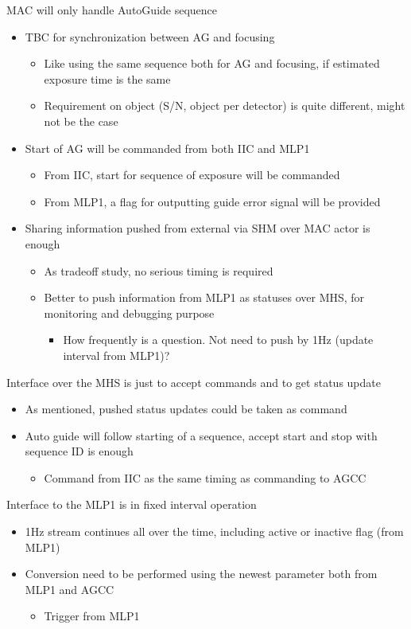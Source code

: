 \documentclass[a4paper,notitlepage]{article}
\begin{document}
MAC will only handle AutoGuide sequence
\begin{itemize}
  \item TBC for synchronization between AG and focusing
  \begin{itemize}
    \item Like using the same sequence both for AG and focusing, if estimated exposure time is the same
    \item Requirement on object (S/N, object per detector) is quite different, might not be the case
  \end{itemize}
  \item Start of AG will be commanded from both IIC and MLP1
  \begin{itemize}
    \item From IIC, start for sequence of exposure will be commanded
    \item From MLP1, a flag for outputting guide error signal will be provided
  \end{itemize}
  \item Sharing information pushed from external via SHM over MAC actor is enough
  \begin{itemize}
    \item As tradeoff study, no serious timing is required
    \item Better to push information from MLP1 as statuses over MHS, for monitoring and debugging purpose
    \begin{itemize}
      \item How frequently is a question. Not need to push by 1Hz (update interval from MLP1)?
    \end{itemize}
  \end{itemize}
\end{itemize}

Interface over the MHS is just to accept commands and to get status update
\begin{itemize}
  \item As mentioned, pushed status updates could be taken as command
  \item Auto guide will follow starting of a sequence, accept start and stop with sequence ID is enough
  \begin{itemize}
    \item Command from IIC as the same timing as commanding to AGCC
  \end{itemize}
\end{itemize}

Interface to the MLP1 is in fixed interval operation
\begin{itemize}
  \item 1Hz stream continues all over the time, including active or inactive flag (from MLP1)
  \item Conversion need to be performed using the newest parameter both from MLP1 and AGCC
  \begin{itemize}
    \item Trigger from MLP1
  \end{itemize}
\end{itemize}
\end{document}
